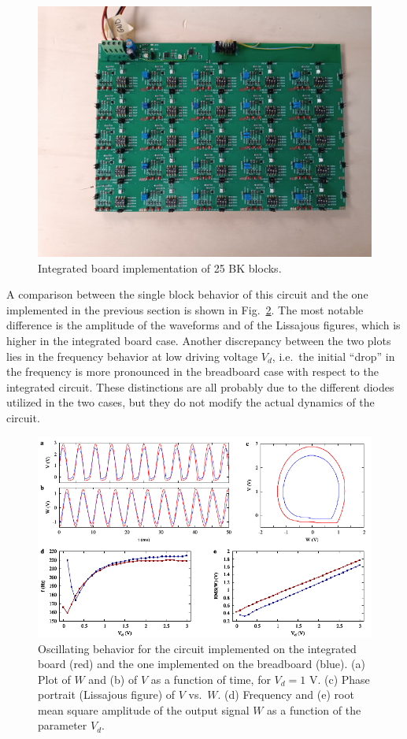 \begin{figure}[!htbp]
    \centering
        \includegraphics[width=.8\linewidth]{images/photo_integrated_board.jpeg}
        \caption{Integrated board implementation of 25 BK blocks.
        }\label{fig: photo integrated board}
\end{figure}

A comparison between the single block behavior of this circuit and the one implemented in the previous section
is shown in Fig.~\ref{fig:oscillation board}. The most notable difference is the amplitude of the waveforms and of
the Lissajous figures, which is higher in the integrated board case. Another discrepancy between the two plots lies
in the frequency behavior at low driving voltage $V_d$, i.e.\ the initial ``drop'' in the frequency is more pronounced
in the breadboard case with respect to the integrated circuit. These distinctions are all probably due to the different diodes
utilized in the two cases, but they do not modify the actual dynamics of the circuit.

\begin{figure}[!htbp]
    \centering
    \includegraphics[width=\linewidth]{../blocks/1_block/board_new/single_block.pdf}
    \caption{Oscillating behavior for the circuit implemented on
    the integrated board (red) and the one implemented on the breadboard (blue).
    (a) Plot of $W$ and (b) of $V$ as a function of time, for $V_d=1$ V.
    (c) Phase portrait (Lissajous figure) of $V$ vs.\ $W$. (d)
    Frequency and (e) root mean square amplitude of the
    output signal $W$ as a function of the parameter $V_d$.}\label{fig:oscillation board}
\end{figure}

